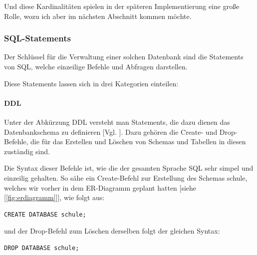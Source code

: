 \documentclass[12pt,a4paper,bibliography=totocnumbered,listof=totocnumbered]{scrartcl}
\begin{document}
Und diese Kardinalitäten spielen in der späteren Implementierung eine große Rolle, wozu ich aber im nächsten Abschnitt kommen möchte.



\subsubsection{SQL-Statements}
Der Schlüssel für die Verwaltung einer solchen Datenbank sind die \glqq Statements\grqq{} von SQL, welche einzeilige Befehle und Abfragen darstellen. 


Diese Statements lassen sich in drei Kategorien einteilen:
\paragraph{DDL}

Unter der Abkürzung DDL versteht man Statements, die dazu dienen das Datenbankschema zu definieren [Vgl. \cite{wiki/SQL}].
Dazu gehören die \glqq Create-\grqq{} und \glqq Drop-Befehle\grqq{}, die für das Erstellen und Löschen von Schemas und Tabellen in diesen zuständig sind.

Die Syntax dieser Befehle ist, wie die der gesamten Sprache SQL sehr simpel und einzeilig gehalten.
So sähe ein \glqq Create-Befehl\grqq{} zur Erstellung des Schemas \glqq schule\grqq{}, welches wir vorher in dem ER-Diagramm geplant hatten [siehe [\ref{fig:erdiagramm}]], wie folgt aus:
\\
\vspace{1em}
\begin{lstlisting}[caption=SQL Create Schema, label=lst:sql-create-schema]
CREATE DATABASE schule;
\end{lstlisting}

und der \glqq Drop-Befehl\grqq{} zum Löschen derselben folgt der gleichen Syntax:
\\
\vspace{1em}
\begin{lstlisting}[caption= SQL Drop Schema, label=lst:sql-drop-schema]
DROP DATABASE schule;
\end{lstlisting}
\end{document}
